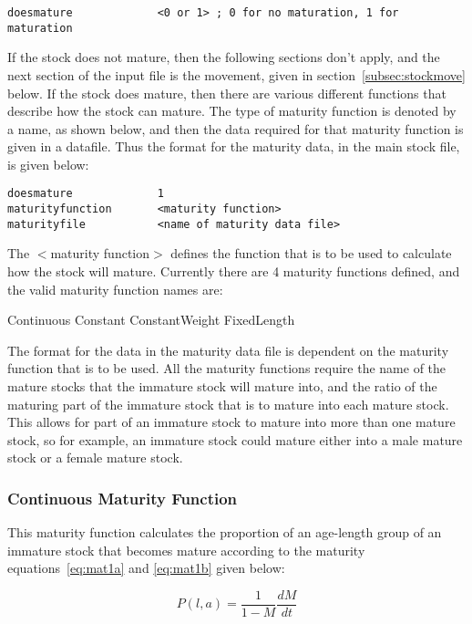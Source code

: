 \documentclass [a4paper, 10pt]{book}
\begin{document}
{\small\begin{verbatim}
doesmature             <0 or 1> ; 0 for no maturation, 1 for maturation
\end{verbatim}}

If the stock does not mature, then the following sections don't apply, and the next section of the input file is the movement, given in section~\ref{subsec:stockmove} below.  If the stock does mature, then there are various different functions that describe how the stock can mature.  The type of maturity function is denoted by a name, as shown below, and then the data required for that maturity function is given in a datafile.  Thus the format for the maturity data, in the main stock file, is given below:

{\small\begin{verbatim}
doesmature             1
maturityfunction       <maturity function>
maturityfile           <name of maturity data file>
\end{verbatim}}

The $<$maturity function$>$ defines the function that is to be used to calculate how the stock will mature.  Currently there are 4 maturity functions defined, and the valid maturity function names are:

\bigskip
Continuous\newline
Constant\newline
ConstantWeight\newline
FixedLength

\bigskip
The format for the data in the maturity data file is dependent on the maturity function that is to be used.  All the maturity functions require the name of the mature stocks that the immature stock will mature into, and the ratio of the maturing part of the immature stock that is to mature into each mature stock.  This allows for part of an immature stock to mature into more than one mature stock, so for example, an immature stock could mature either into a male mature stock or a female mature stock.

\subsubsection{Continuous Maturity Function}
This maturity function calculates the proportion of an age-length group of an immature stock that becomes mature according to the maturity equations~\ref{eq:mat1a} and \ref{eq:mat1b} given below:

\begin{equation}\label{eq:mat1a}
P(l, a) = {\frac{1}{1 - M}}{\frac{dM}{dt}}
\end{equation}
\end{document}
